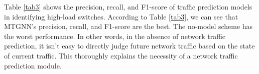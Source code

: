 \documentclass[journal]{IEEEtran}
\begin{document}
Table \ref{tab3} shows the precision, recall, and F1-score of traffic prediction models in identifying high-load switches. %
According to Table \ref{tab3}, we can see that MTGNN's precision, recall, and F1-score are the best. The no-model scheme has the worst performance. In other words, in the absence of network traffic prediction, it isn't easy to directly judge future network traffic based on the state of current traffic. This thoroughly explains the necessity of a network traffic prediction module.



\end{document}

